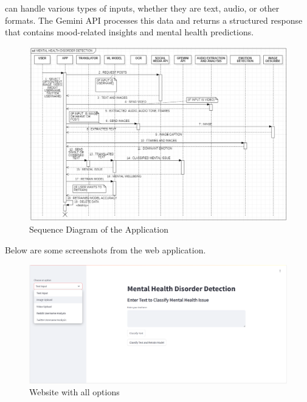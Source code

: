 can handle various types of inputs, whether they are text, audio, or other formats. The Gemini API processes this data and returns a structured response that contains mood-related insights and mental health predictions.
    
\begin{figure}[h!]  
    \centering
    \includegraphics[width=1.0\textwidth]{Images/Sequence Diagram.png}  
    \caption{Sequence Diagram of the Application}
    \label{012i}  %
\end{figure}

\noindent
Below are some screenshots from the web application.

\begin{figure}[h!]  
    \centering
    \includegraphics[width=1.0\textwidth]{App Images/01 Interface.png}  
    \caption{Website with all options}
    \label{01i}  %
\end{figure}

\pagebreak


